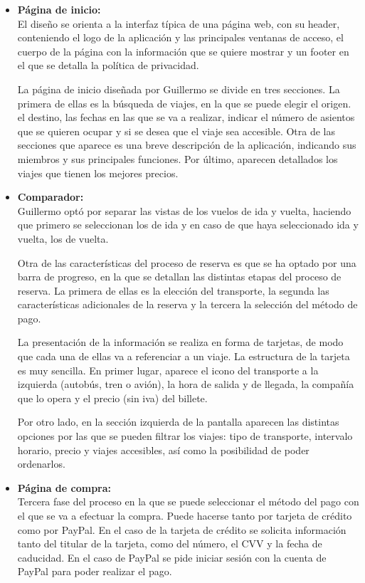 \begin{itemize}
    \item\textbf{Página de inicio:} \\ El diseño se orienta a la interfaz típica de una página web, con su header, conteniendo el logo de la aplicación y las principales ventanas de acceso, el cuerpo de la página con la información que se quiere mostrar y un footer en el que se detalla la política de privacidad.
    
    La página de inicio diseñada por Guillermo se divide en tres secciones. La primera de ellas es la búsqueda de viajes, en la que se puede elegir el origen. el destino, las fechas en las que se va a realizar, indicar el número de asientos que se quieren ocupar y si se desea que el viaje sea accesible.
    Otra de las secciones que aparece es una breve descripción de la aplicación, indicando sus miembros y sus principales funciones.
    Por último, aparecen detallados los viajes que tienen los mejores precios.

    \item\textbf{Comparador:} \\ Guillermo optó por separar las vistas de los vuelos de ida y vuelta, haciendo que primero se seleccionan los de ida y en caso de que haya seleccionado ida y vuelta, los de vuelta. 
    
    Otra de las características del proceso de reserva es que se ha optado por una barra de progreso, en la que se detallan las distintas etapas del proceso de reserva. La primera de ellas es la elección del transporte, la segunda las características adicionales de la reserva y la tercera la selección del método de pago.

    La presentación de la información se realiza en forma de tarjetas, de modo que cada una de ellas va a referenciar a un viaje. La estructura de la tarjeta es muy sencilla. En primer lugar, aparece el icono del transporte a la izquierda (autobús, tren o avión), la hora de salida y de llegada, la compañía que lo opera y el precio (sin iva) del billete.

    Por otro lado, en la sección izquierda de la pantalla aparecen las distintas opciones por las que se pueden filtrar los viajes: tipo de transporte, intervalo horario, precio y viajes accesibles, así como la posibilidad de poder ordenarlos.
    \item\textbf{Página de compra:} \\ Tercera fase del proceso en la que se puede seleccionar el método del pago con el que se va a efectuar la compra. Puede hacerse tanto por tarjeta de crédito como por PayPal.
    En el caso de la tarjeta de crédito se solicita información tanto del titular de la tarjeta, como del número, el CVV y la fecha de caducidad.
    En el caso de PayPal se pide iniciar sesión con la cuenta de PayPal para poder realizar el pago.


\end{itemize}
